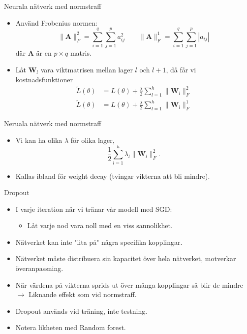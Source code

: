 \documentclass[10pt,english]{beamer}
\begin{document}
\begin{frame}{Neurala nätverk med normstraff}
    \begin{itemize}
        \item Använd Frobenius normen:
        \begin{equation*}
            \|\mathbf{A}\|_{F}^2 = \sum_{i=1}^{q}\sum_{j=1}^{p} a_{ij}^2 \qquad \|\mathbf{A}\|^1_{F} = \sum_{i=1}^{q}\sum_{j=1}^{p} |a_{ij}|
        \end{equation*}
        där $\mathbf{A}$ är en $p \times q$ matris.
        \item Låt $\mathbf{W}_l$ vara viktmatrisen mellan lager $l$ och $l+1$, då får vi kostnadsfunktioner
        \begin{align*}
            \tilde{L}(\theta) &= L(\theta) + \frac{\lambda}{2} \sum_{l=1}^{h} \| \mathbf{W}_l \|_{F}^{2} \\
            \tilde{L}(\theta) &= L(\theta) + \frac{\lambda}{2} \sum_{l=1}^{h} \| \mathbf{W}_l \|_{F}^{1}
        \end{align*}
    \end{itemize}
\end{frame}

\begin{frame}{Neruala nätverk med normstraff}
    \begin{itemize}
        \item Vi kan ha olika $\lambda$ för olika lager,
        \begin{equation*}
            \frac{1}{2} \sum_{l=1}^h \lambda_l \|\mathbf{W}_l\|^2_F.
        \end{equation*}
        \item Kallas ibland för weight decay (tvingar vikterna att bli mindre).
    \end{itemize}
\end{frame}

\begin{frame}{Dropout}

    \begin{itemize}
        \item I varje iteration när vi tränar vår modell med SGD:
        \begin{itemize}
            \item Låt varje nod vara noll med en viss sannolikhet.
        \end{itemize}
        \item Nätverket kan inte "lita på" några specifika kopplingar.
        \item Nätverket måste distribuera sin kapacitet över hela nätverket, motverkar överanpassning.
        \item När värdena på vikterna sprids ut över många kopplingar så blir de mindre $\rightarrow$ Liknande effekt som vid normstraff.
        \item Dropout används vid träning, inte testning.
        \item Notera likheten med Random forest.
    \end{itemize}
    
\end{frame}
\end{document}

